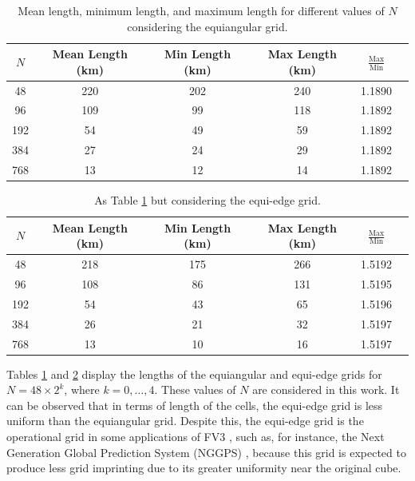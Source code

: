 \documentclass[preprint,12pt]{elsarticle}
\begin{document}
\begin{linenumbers}
\begin{table}[htbp]
	\caption{Mean length, minimum length, and maximum length for different values of $N$ considering the equiangular grid.\label{g2-dx-table}}
	\begin{tabular}{|c|c|c|c|c|c}\hline
		$N$ & Mean Length (km) & Min Length (km) & Max Length (km) & $\frac{\text{Max}}{\text{Min}}$ \\ \hline
		48 & 220 & 202 & 240 & 1.1890 \\
		96 & 109 & 99 & 118  & 1.1892 \\
		192 & 54 & 49 & 59  & 1.1892 \\
		384 & 27 & 24 & 29  & 1.1892 \\
		768 & 13 & 12 & 14  & 1.1892\\
		\hline
	\end{tabular} 
\end{table}
\begin{table}[htbp]
	\centering
	\caption{As Table \ref{g2-dx-table} but considering the equi-edge grid. \label{g0-dx-table}}
	\begin{tabular}{|c|c|c|c|c|c}\hline
		$N$ & Mean Length (km) & Min Length (km) & Max Length (km) & $\frac{\text{Max}}{\text{Min}}$ \\ \hline 
		48 & 218 & 175 & 266 & 1.5192 \\
		96 & 108 & 86 & 131 & 1.5195 \\
		192 & 54 & 43 & 65 & 1.5196 \\
		384 & 26 & 21 & 32 & 1.5197 \\
		768 & 13 & 10 & 16 & 1.5197 \\
		\hline
	\end{tabular}
\end{table}

Tables  \ref{g2-dx-table} and \ref{g0-dx-table} display the lengths of the  equiangular and equi-edge grids for $N=48\times 2^k$, 
where $k = 0,\ldots, 4$. These values of $N$ are considered in this work.
It can be observed that in terms of length of the cells, the equi-edge grid is less uniform than the equiangular grid.
Despite this, the equi-edge grid is the operational grid in some applications of FV3 \cite{harris:2021,chen:2021}, such as, for instance, 
the Next Generation Global Prediction System (NGGPS) \cite{zhou:2019}, 
because this grid is expected to produce less grid imprinting due to its greater uniformity near the original cube.


\end{linenumbers}
\end{document}
